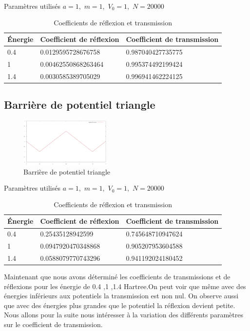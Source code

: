\begin{table}[!ht]
\centering
Paramètres utilisés  $a=1$,\ $m=1$,\ $V_{0}=1$,\ $N=20000$\\
\begin{tabular}{|l|l|l|}
\hline  Énergie & Coefficient de réflexion  & Coefficient de transmission \\
\hline  0.4 &  0.0129595728676758 &  0.987040427735775\\
\hline 1 & 0.00462550868263464 & 0.995374492199424\\ 
\hline 1.4 & 0.0030585389705029 & 0.996941462224125\\
\hline
\end{tabular}
\caption{Coefficients de réflexion et transmission}
\label{tab7}
\end{table}

\subsection{Barrière de potentiel triangle}
\begin{center}

\end{center}
\begin{figure}[!ht]
    \center
    \includegraphics[width=0.4\textwidth]{potentieltriangle.jpg}
    \caption{ Barrière de potentiel triangle}
    \label{potentieltriangle}
\end{figure}

\begin{table}[!ht]
\centering
Paramètres utilisés  $a=1$,\ $m=1$,\ $V_{0}=1$,\ $N=20000$\\
\begin{tabular}{|l|l|l|}
\hline  Énergie & Coefficient de réflexion  & Coefficient de transmission \\
\hline  0.4 & 0.25435128942599 &  0.745648710947624\\
\hline 1 & 0.0947920470348868 & 0.905207953604588\\ 
\hline 1.4 &0.0588079770743296& 0.941192024180452\\
\hline
\end{tabular}
\caption{Coefficients de réflexion et transmission}
\label{tab}
\end{table}


Maintenant que nous avons déterminé les coefficients de transmissions et de réflexions pour les énergie de 0.4 ,1 ,1.4  Hartree.On peut voir que même avec des énergies inférieurs aux potentiels la transmission est non nul. On observe aussi que avec des énergies plus grandes que le potentiel la réflexion devient petite. Nous allons pour la suite nous intéresser à la variation des différents paramètres sur le coefficient de transmission.







